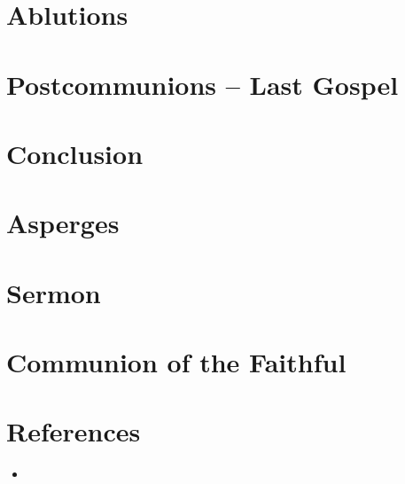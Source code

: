 \documentclass[letterpaper, twocolumn]{article}
\begin{document}
	\section*{Ablutions}
	\section*{Postcommunions -- Last Gospel}
	\section*{Conclusion}
	\section*{Asperges}
	\section*{Sermon}
	\section*{Communion of the Faithful}
	\section*{References}
		\begin{itemize}
			\item 
		\end{itemize}
\end{document}
